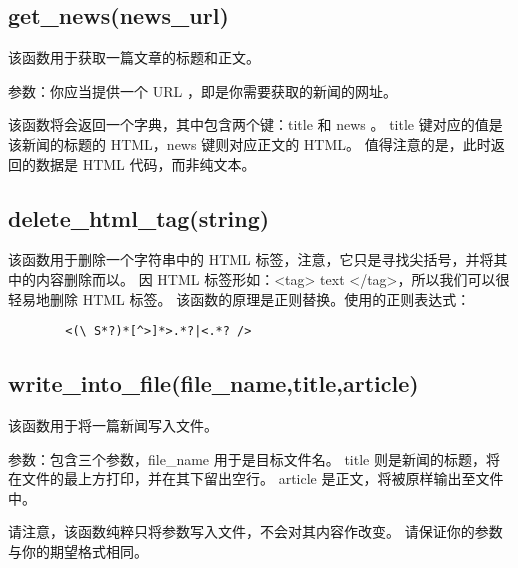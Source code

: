 \documentclass{article}
\begin{document}
    \subsection{get\_news(news\_url)}
    该函数用于获取一篇文章的标题和正文。
    \par
    参数：你应当提供一个 URL ，即是你需要获取的新闻的网址。
    \par
    该函数将会返回一个字典，其中包含两个键：title 和 news 。
    title 键对应的值是该新闻的标题的 HTML，news 键则对应正文的 HTML。
    值得注意的是，此时返回的数据是 HTML 代码，而非纯文本。
    \subsection{delete\_html\_tag(string)}
    该函数用于删除一个字符串中的 HTML 标签，注意，它只是寻找尖括号，并将其中的内容删除而以。
    因 HTML 标签形如：<tag> text </tag>，所以我们可以很轻易地删除 HTML 标签。
    该函数的原理是正则替换。使用的正则表达式：
    \begin{lstlisting}
        <(\ S*?)*[^>]*>.*?|<.*? />
    \end{lstlisting}
    \subsection{write\_into\_file(file\_name,title,article)}
    该函数用于将一篇新闻写入文件。
    \par
    参数：包含三个参数，file\_name 用于是目标文件名。
    title 则是新闻的标题，将在文件的最上方打印，并在其下留出空行。
    article 是正文，将被原样输出至文件中。
    \par
    请注意，该函数纯粹只将参数写入文件，不会对其内容作改变。
    请保证你的参数与你的期望格式相同。
\end{document}
